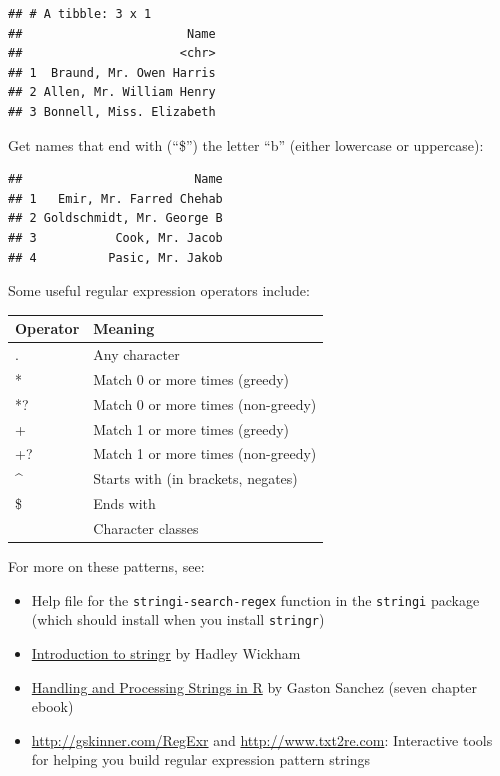 \documentclass[]{book}
\makeatletter
\newenvironment{Shaded}{\begin{snugshade}}{\end{snugshade}}
\newcommand{\KeywordTok}[1]{\textcolor[rgb]{0.13,0.29,0.53}{\textbf{#1}}}
\newcommand{\StringTok}[1]{\textcolor[rgb]{0.31,0.60,0.02}{#1}}
\newcommand{\OperatorTok}[1]{\textcolor[rgb]{0.81,0.36,0.00}{\textbf{#1}}}
\newcommand{\NormalTok}[1]{#1}
\providecommand{\tightlist}{%
  \setlength{\itemsep}{0pt}\setlength{\parskip}{0pt}}
\newenvironment{kframe}{%
\medskip{}
\setlength{\fboxsep}{.8em}
 \def\at@end@of@kframe{}%
 \ifinner\ifhmode%
  \def\at@end@of@kframe{\end{minipage}}%
  \begin{minipage}{\columnwidth}%
 \fi\fi%
 \def\FrameCommand##1{\hskip\@totalleftmargin \hskip-\fboxsep
 \colorbox{shadecolor}{##1}\hskip-\fboxsep
     \hskip-\linewidth \hskip-\@totalleftmargin \hskip\columnwidth}%
 \MakeFramed {\advance\hsize-\width
   \@totalleftmargin\z@ \linewidth\hsize
   \@setminipage}}%
 {\par\unskip\endMakeFramed%
 \at@end@of@kframe}
\renewenvironment{Shaded}{\begin{kframe}}{\end{kframe}}
\theoremstyle{definition}
\theoremstyle{definition}
\theoremstyle{definition}
\theoremstyle{remark}
\makeatother
\begin{document}
\begin{verbatim}
## # A tibble: 3 x 1
##                       Name
##                      <chr>
## 1  Braund, Mr. Owen Harris
## 2 Allen, Mr. William Henry
## 3 Bonnell, Miss. Elizabeth
\end{verbatim}

Get names that end with (``\$'') the letter ``b'' (either lowercase or
uppercase):

\begin{Shaded}
\end{Shaded}

\begin{verbatim}
##                        Name
## 1   Emir, Mr. Farred Chehab
## 2 Goldschmidt, Mr. George B
## 3           Cook, Mr. Jacob
## 4          Pasic, Mr. Jakob
\end{verbatim}

Some useful regular expression operators include:

\begin{tabular}{l|l}
\hline
Operator & Meaning\\
\hline
. & Any character\\
\hline
* & Match 0 or more times (greedy)\\
\hline
*? & Match 0 or more times (non-greedy)\\
\hline
+ & Match 1 or more times (greedy)\\
\hline
+? & Match 1 or more times (non-greedy)\\
\hline
\textasciicircum{} & Starts with (in brackets, negates)\\
\hline
\$ & Ends with\\
\hline
[...] & Character classes\\
\hline
\end{tabular}

For more on these patterns, see:

\begin{itemize}
\tightlist
\item
  Help file for the \texttt{stringi-search-regex} function in the
  \texttt{stringi} package (which should install when you install
  \texttt{stringr})
\item
  \href{https://cran.r-project.org/web/packages/stringr/vignettes/stringr.html}{Introduction
  to stringr} by Hadley Wickham
\item
  \href{http://gastonsanchez.com/Handling_and_Processing_Strings_in_R.pdf}{Handling
  and Processing Strings in R} by Gaston Sanchez (seven chapter ebook)
\item
  \url{http://gskinner.com/RegExr} and \url{http://www.txt2re.com}:
  Interactive tools for helping you build regular expression pattern
  strings
\end{itemize}
\end{document}
